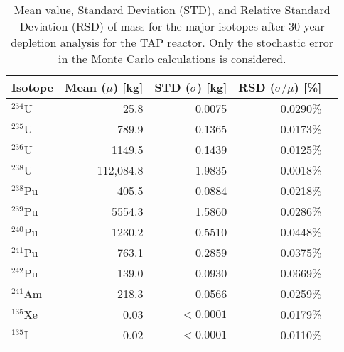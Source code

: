 \begin{table}[htp!]
	\centering
	\caption{Mean value, Standard Deviation (STD), and Relative Standard 
	Deviation (RSD) of mass for the major isotopes after 30-year depletion 
	analysis for the \gls{TAP} reactor. Only the stochastic error in the Monte 
	Carlo calculations is considered.}
	\begin{tabularx}{0.7\textwidth}{L R R R R}
		\hline
		\textbf{Isotope}  & \textbf{Mean ($\mu$) [kg]} & \textbf{STD 
		($\sigma$) [kg]} & \textbf{RSD ($\sigma/\mu$) [\%]}\\ \hline
		$^{234}$U  & 25.8  & 0.0075 & 0.0290\% \\
		$^{235}$U  & 789.9 & 0.1365 & 0.0173\% \\
		$^{236}$U  & 1149.5& 0.1439 & 0.0125\% \\
		$^{238}$U  & 112,084.8 & 1.9835 & 0.0018\% \\
		$^{238}$Pu & 405.5 & 0.0884 & 0.0218\% \\
		$^{239}$Pu & 5554.3& 1.5860 & 0.0286\% \\
		$^{240}$Pu & 1230.2& 0.5510 & 0.0448\% \\
		$^{241}$Pu & 763.1 & 0.2859 & 0.0375\% \\
		$^{242}$Pu & 139.0 & 0.0930  & 0.0669\% \\
		$^{241}$Am & 218.3 & 0.0566  & 0.0259\% \\
		$^{135}$Xe & 0.03  & $<0.0001$& 0.0179\% \\
		$^{135}$I  & 0.02  & $<0.0001$& 0.0110\% \\ \hline
	\end{tabularx}
	\label{tab:uq-serpent-mean-std-rsd}
	\vspace{-0.9em}
\end{table}

